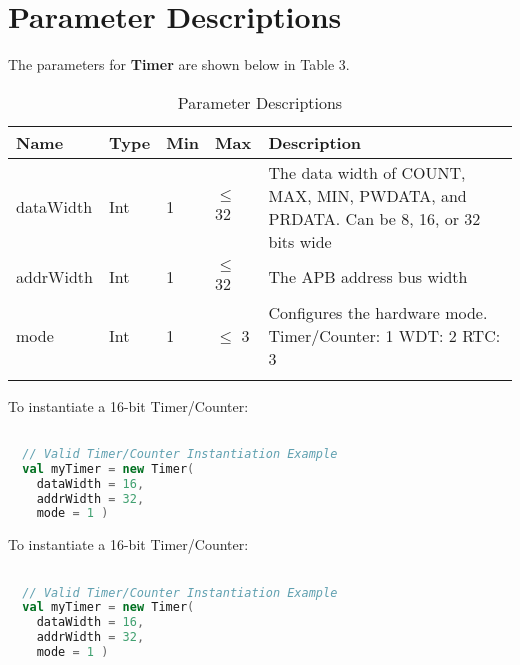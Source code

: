 
\section{Parameter Descriptions}

The parameters for \textbf{Timer} are shown below in
Table 3.

\renewcommand*{\arraystretch}{1.4}
\begin{longtable}[H]{
    | p{}
    | p{}
    | p{}
    | p{}
    | p{} |
  }
  \hline
  \textbf{Name} &
  \textbf{Type} &
  \textbf{Min}  &
  \textbf{Max}  &
  \textbf{Description}            \\ \hline \hline

  dataWidth   &
  Int       &
  1         &
  $\leq$ 32          &
  The data width of COUNT, MAX, MIN, PWDATA, and PRDATA. Can be 8, 16, or 32 bits wide \\ \hline

  addrWidth     &
  Int           &
  1             &
  $\leq$ 32       &
  The APB address bus width  \\ \hline

  mode     &
  Int           &
  1             &
  $\leq$ 3       &
  Configures the hardware mode. \newline
  Timer/Counter: 1 \newline
  WDT: 2 \newline
  RTC: 3  \\ \hline

  \caption{Parameter Descriptions}\label{table:params}
\end{longtable}

To instantiate a 16-bit Timer/Counter:

\begin{lstlisting}[language=Scala]

  // Valid Timer/Counter Instantiation Example
  val myTimer = new Timer(
    dataWidth = 16, 
    addrWidth = 32,
    mode = 1 ) 

  \end{lstlisting}

To instantiate a 16-bit Timer/Counter:

\begin{lstlisting}[language=Scala]

  // Valid Timer/Counter Instantiation Example
  val myTimer = new Timer(
    dataWidth = 16, 
    addrWidth = 32,
    mode = 1 ) 

  \end{lstlisting}
